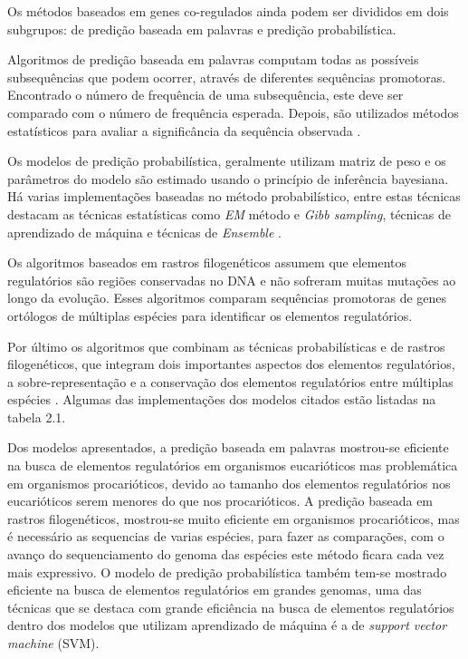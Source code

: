 Os métodos baseados em genes co-regulados ainda podem ser divididos em dois subgrupos: de predição baseada em palavras e predição probabilística.

Algoritmos de predição baseada em palavras computam todas as possíveis subsequências que podem ocorrer, através de diferentes sequências promotoras. Encontrado o número de frequência de uma subsequência, este deve ser comparado com o número de frequência esperada. Depois, são utilizados métodos estatísticos para avaliar a significância da sequência observada \cite{Rombauts2003}.

Os modelos de predição probabilística, geralmente utilizam matriz de peso e os parâmetros do modelo são estimado usando o princípio de inferência bayesiana. Há varias implementações baseadas no método probabilístico, entre estas técnicas destacam as técnicas estatísticas como \textit{EM} método e \textit{Gibb sampling}, técnicas de aprendizado de máquina e técnicas de \textit{Ensemble} \cite{Das2007}.

Os algoritmos baseados em rastros filogenéticos assumem que elementos regulatórios são regiões conservadas no DNA e não sofreram muitas mutações ao longo da evolução. Esses algoritmos comparam sequências promotoras de genes ortólogos de múltiplas espécies para identificar os elementos regulatórios.

Por último os algoritmos que combinam as técnicas probabilísticas e de rastros filogenéticos, que integram dois importantes aspectos dos elementos regulatórios, a sobre-representação e a conservação dos elementos regulatórios entre múltiplas espécies \cite{Das2007}. Algumas das implementações dos modelos citados estão listadas na tabela 2.1.

Dos modelos apresentados, a predição baseada em palavras mostrou-se eficiente na busca de elementos regulatórios em organismos eucarióticos mas problemática em organismos procarióticos, devido ao tamanho dos elementos regulatórios nos eucarióticos serem menores do que nos procarióticos. A predição baseada em rastros filogenéticos, mostrou-se muito eficiente em organismos procarióticos, mas é necessário as sequencias de varias espécies, para fazer as comparações, com o avanço do sequenciamento do genoma das espécies este método ficara cada vez mais expressivo. O modelo de predição probabilística também tem-se mostrado eficiente na busca de elementos regulatórios em grandes genomas, uma das técnicas que se destaca com  grande eficiência na busca de elementos regulatórios dentro dos modelos que utilizam aprendizado de máquina é a de \textit{support vector machine} (SVM).

